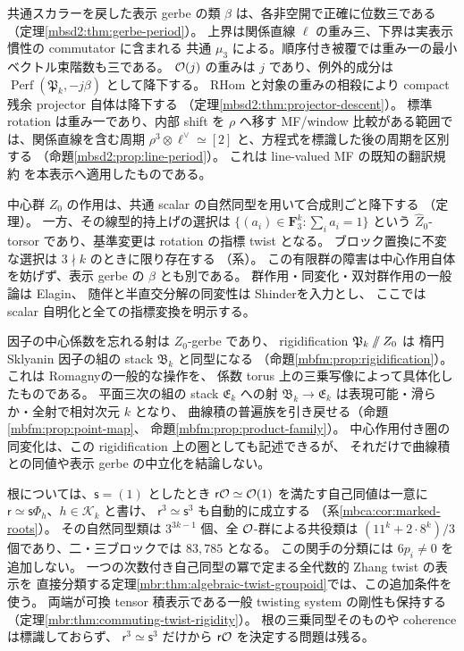 共通スカラーを戻した表示 gerbe の類 $\beta$ は、各非空開で正確に位数三である
（定理\ref{mbsd2:thm:gerbe-period}）。
上界は関係直線 $\ell$ の重み三、下界は実表示慣性の commutator に含まれる
共通 $\mu_3$ による。順序付き被覆では重み一の最小ベクトル束階数も三である。
$\mathcal O(j)$ の重みは $j$ であり、例外的成分は
$\operatorname{Perf}(\mathfrak P_k,-j\beta)$ として降下する。
RHom と対象の重みの相殺により compact 残余 projector 自体は降下する
（定理\ref{mbsd2:thm:projector-descent}）。
標準 rotation は重み一であり、内部 shift を $\rho$ へ移す MF/window 比較がある範囲では、関係直線を含む周期
$\rho^3\otimes\ell^\vee\simeq[2]$ と、方程式を標識した後の周期を区別する
（命題\ref{mbsd2:prop:line-period}）。
これは line-valued MF の既知の翻訳規約
\cite[Definitions~1.1, 1.3]{MBS2PolishchukVaintrob}を本表示へ適用したものである。

中心群 $Z_0$ の作用は、共通 scalar の自然同型を用いて合成則ごと降下する
（定理）。
一方、その線型的持上げの選択は
$\{(a_i)\in\mathbf F_3^k:\sum_i a_i=1\}$ という
$\widehat Z_0$-torsor であり、基準変更は rotation の指標 twist となる。
ブロック置換に不変な選択は $3\nmid k$ のときに限り存在する
（系）。
この有限群の障害は中心作用自体を妨げず、表示 gerbe の $\beta$ とも別である。
群作用・同変化・双対群作用の一般論は Elagin\cite{MEDElagin}、
随伴と半直交分解の同変性は Shinder\cite{MBZAShinder}を入力とし、
ここでは scalar 自明化と全ての指標変換を明示する。

因子の中心係数を忘れる射は $Z_0$-gerbe であり、
rigidification $\mathfrak P_k\mathbin{/\mkern-6mu/}Z_0$ は
楕円 Sklyanin 因子の組の stack $\mathfrak B_k$ と同型になる
（命題\ref{mbfm:prop:rigidification}）。
これは Romagny\cite[Theorem~5.1]{MBFMRomagny}の一般的な操作を、
係数 torus 上の三乗写像によって具体化したものである。
平面三次の組の stack $\mathfrak E_k$ への射
$\mathfrak B_k\to\mathfrak E_k$ は表現可能・滑らか・全射で相対次元 $k$ となり、
曲線積の普遍族を引き戻せる（命題\ref{mbfm:prop:point-map}、
命題\ref{mbfm:prop:product-family}）。
中心作用付き圏の同変化は、この rigidification 上の圏としても記述できるが、
それだけで曲線積との同値や表示 gerbe の中立化を結論しない。

根については、$\mathsf s=(1)$ としたとき
$\mathsf r\mathcal O\simeq\mathcal O(1)$ を満たす自己同値は一意に
$\mathsf r\simeq\mathsf s\Phi_h$、$h\in\mathcal K_k$ と書け、
$\mathsf r^3\simeq\mathsf s^3$ も自動的に成立する
（系\ref{mbca:cor:marked-roots}）。
その自然同型類は $3^{3k-1}$ 個、全 $\mathcal O$-群による共役類は
$(11^k+2\cdot8^k)/3$ 個であり、二・三ブロックでは $83,785$ となる。
この関手の分類には $6p_i\ne0$ を追加しない。
一つの次数付き自己同型の冪で定まる全代数的 Zhang twist の表示を
直接分類する定理\ref{mbr:thm:algebraic-twist-groupoid}では、この追加条件を使う。
両端が可換 tensor 積表示である一般 twisting system の剛性も保持する
（定理\ref{mbr:thm:commuting-twist-rigidity}）。
根の三乗同型そのものや coherence は標識しておらず、
$\mathsf r^3\simeq\mathsf s^3$ だけから $\mathsf r\mathcal O$ を決定する問題は残る。

